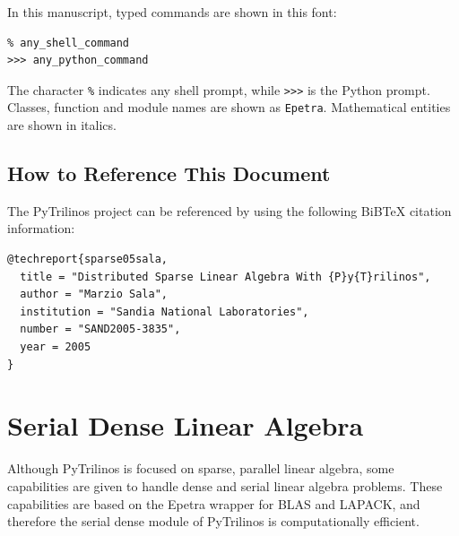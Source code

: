 \documentclass[10pt,relax]{SANDreport}
\begin{document}
In this manuscript, typed commands are shown in this font:
\begin{verbatim}
% any_shell_command
>>> any_python_command
\end{verbatim}
The character \verb!%! indicates any shell prompt, while \verb!>>>! is the
Python prompt. Classes, function and module names are shown as \verb!Epetra!.
Mathematical entities are shown in italics.

\subsection{How to Reference This Document}
\label{sec:reference}

The PyTrilinos project can be referenced by using the following BiBTeX
citation information: 
\begin{verbatim}
@techreport{sparse05sala,
  title = "Distributed Sparse Linear Algebra With {P}y{T}rilinos",
  author = "Marzio Sala",
  institution = "Sandia National Laboratories",
  number = "SAND2005-3835",
  year = 2005
}
\end{verbatim}

\section{Serial Dense Linear Algebra}
\label{sec:serialdense}

Although PyTrilinos is focused on sparse, parallel linear algebra, some
capabilities are given to handle dense and serial linear algebra problems.
These capabilities are based on the Epetra wrapper for BLAS and LAPACK, and
therefore the serial dense module of PyTrilinos is computationally efficient.
\end{document}
